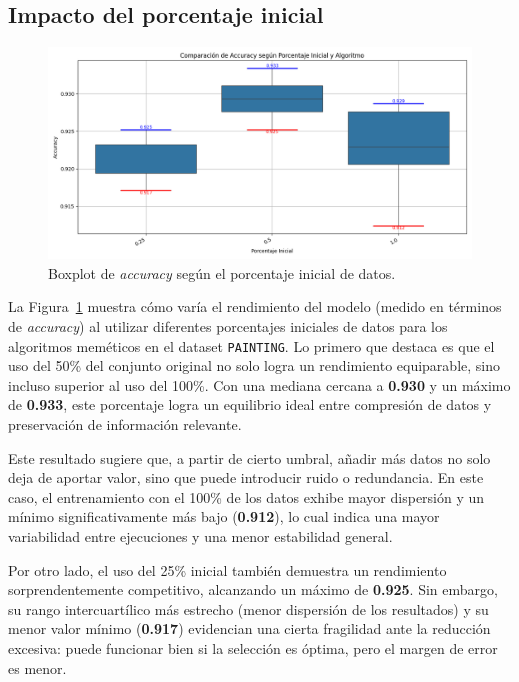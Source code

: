 \subsection{Impacto del porcentaje inicial}
\begin{figure}[h]
    \centering
    \includegraphics[width=1\textwidth]{imagenes/evaluaciones/painting/comparacion-por-porcentaje}
    \caption{Boxplot de \textit{accuracy} según el porcentaje inicial de datos.}
    \label{fig:accuracy_porcentaje_painting}
\end{figure}

La Figura~\ref{fig:accuracy_porcentaje_painting} muestra cómo varía el rendimiento del modelo (medido en términos de \textit{accuracy})
al utilizar diferentes porcentajes iniciales de datos para los algoritmos meméticos en el dataset \texttt{PAINTING}.
Lo primero que destaca es que el uso del 50\% del conjunto original no solo logra un rendimiento equiparable, sino incluso superior al uso del 100\%.
Con una mediana cercana a \textbf{0.930} y un máximo de \textbf{0.933}, este porcentaje logra un equilibrio ideal entre compresión de datos y preservación de información relevante.

Este resultado sugiere que, a partir de cierto umbral, añadir más datos no solo deja de aportar valor, sino que puede introducir ruido o redundancia.
En este caso, el entrenamiento con el 100\% de los datos exhibe mayor dispersión y un mínimo significativamente más bajo (\textbf{0.912}),
lo cual indica una mayor variabilidad entre ejecuciones y una menor estabilidad general.

Por otro lado, el uso del 25\% inicial también demuestra un rendimiento sorprendentemente competitivo,
alcanzando un máximo de \textbf{0.925}.
Sin embargo, su rango intercuartílico más estrecho (menor dispersión de los resultados) y su menor valor mínimo (\textbf{0.917}) evidencian una cierta fragilidad ante la reducción excesiva:
puede funcionar bien si la selección es óptima, pero el margen de error es menor.

